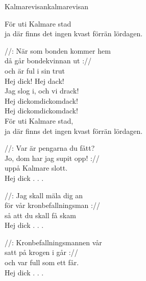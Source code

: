 \begin{song}{Kalmarevisan}{kalmarevisan}
\begin{vers}
För uti Kalmare stad\\
ja där finns det ingen kvast förrän lördagen.\\
\end{vers}
\begin{vers}
//: När som bonden kommer hem\\
då går bondekvinnan ut ://\\
och är ful i sin trut\\
Hej dick! Hej dack!\\
Jag slog i, och vi drack!\\
Hej dickomdickomdack!\\
Hej dickomdickomdack!\\
För uti Kalmare stad,\\
ja där finns det ingen kvast förrän lördagen.\\
\end{vers}
\begin{vers}
//: Var är pengarna du fått?\\
Jo, dom har jag supit opp! ://\\
uppå Kalmare slott.\\
Hej dick . . .\\
\end{vers}
\begin{vers}
//: Jag skall mäla dig an\\
för vår kronbefallningsman ://\\
så att du skall få skam\\
Hej dick . . .\\
\end{vers}
\begin{vers}
//: Kronbefallningsmannen vår\\
satt på krogen i går ://\\
och var full som ett får.\\
Hej dick . . .\\
\end{vers}
\end{song}









